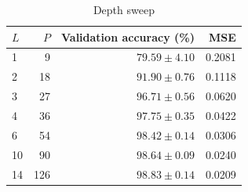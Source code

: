 \begin{table}[htbp]
\centering
\caption{Depth sweep}
\label{tab:depth}
\small
\begin{tabular}{lrrr}
\toprule
$L$ & $P$ & Validation accuracy (\%) & MSE \\
\midrule
1 & 9 & $79.59 \pm 4.10$ & 0.2081 \\
2 & 18 & $91.90 \pm 0.76$ & 0.1118 \\
3 & 27 & $96.71 \pm 0.56$ & 0.0620 \\
4 & 36 & $97.75 \pm 0.35$ & 0.0422 \\
6 & 54 & $98.42 \pm 0.14$ & 0.0306 \\
10 & 90 & $98.64 \pm 0.09$ & 0.0240 \\
14 & 126 & $98.83 \pm 0.14$ & 0.0209 \\
\bottomrule
\end{tabular}
\end{table}
